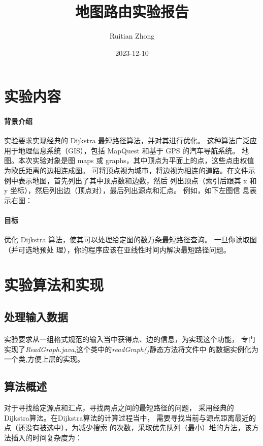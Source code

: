 \documentclass[12pt,a4paper]{ctexart}
\title{地图路由实验报告}
\author{Ruitian Zhong}
\date{2023-12-10}
\begin{document}
\maketitle
\section{实验内容}
\paragraph{背景介绍}


实验要求实现经典的 Dijkstra 最短路径算法，并对其进行优化。 这种算法广泛应用于地理信息系统（GIS），包括
MapQuest 和基于 GPS 的汽车导航系统。
地图。本次实验对象是图 maps 或 graphs，其中顶点为平面上的点，这些点由权值为欧氏距离的边相连成图。
可将顶点视为城市，将边视为相连的道路。在文件示例中表示地图，首先列出了其中顶点数和边数，然后
列出顶点（索引后跟其 x 和 y 坐标），然后列出边（顶点对），最后列出源点和汇点。 例如，如下左图信
息表示右图：
\paragraph{目标}
优化 Dijkstra 算法，使其可以处理给定图的数万条最短路径查询。 一旦你读取图（并可选地预处
理），你的程序应该在亚线性时间内解决最短路径问题。

\section{实验算法和实现}


\subsection{处理输入数据}

\paragraph{}
实验要求从一组格式规范的输入当中获得点、边的信息，为实现这个功能，
专门实现了\textit{ReadGraph.java},这个类中的\textit{readGraph()}静态方法将文件中
的数据实例化为一个类,方便上层的实现。

\subsection{算法概述}
对于寻找给定源点和汇点，寻找两点之间的最短路径的问题，
采用经典的 Dijkstra算法。在Dijkstra算法的计算过程当中，
需要寻找当前与源点距离最近的点（还没有被选中），为减少搜索
的次数，采取优先队列（最小）堆的方法，该方法插入的时间复杂度为：
\end{document}
